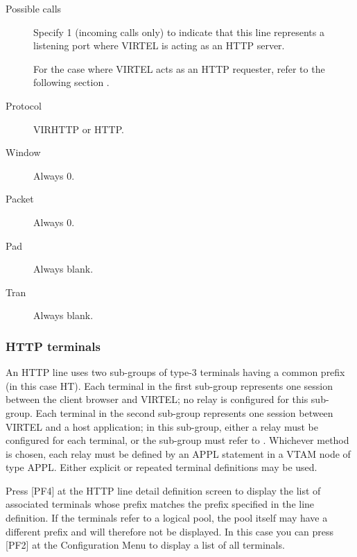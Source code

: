 \documentclass[letterpaper,10pt,english]{sphinxmanual}
\begin{document}
\begin{description}
\item[{Possible calls}] \leavevmode
Specify 1 (incoming calls only) to indicate that this line
represents a listening port where VIRTEL is acting as an HTTP
server.

For the case where VIRTEL acts as an HTTP requester, refer to the following section {\hyperref[\detokenize{connectivity_guide:bookmark42}]{}}.

\item[{Protocol}] \leavevmode
VIRHTTP or HTTP.

\item[{Window}] \leavevmode
Always 0.

\item[{Packet}] \leavevmode
Always 0.

\item[{Pad}] \leavevmode
Always blank.

\item[{Tran}] \leavevmode
Always blank.

\end{description}


\subsubsection{HTTP terminals}
\label{\detokenize{connectivity_guide:http-terminals}}
An HTTP line uses two sub-groups of type-3 terminals having a common prefix (in this case HT). Each terminal in the first sub-group represents one session between the client browser and VIRTEL; no relay is configured for this sub- group. Each terminal in the second sub-group represents one session between VIRTEL and a host application; in this sub-group, either a relay must be configured for each terminal, or the sub-group must refer to {\hyperref[\detokenize{connectivity_guide:bookmark246}]{}}. Whichever method is chosen, each relay must be defined by an APPL statement in a VTAM node of type APPL. Either explicit or repeated terminal definitions may be used.

Press {[}PF4{]} at the HTTP line detail definition screen to display the list of associated terminals whose prefix matches the prefix specified in the line definition. If the terminals refer to a logical pool, the pool itself may have a different prefix and will therefore not be displayed. In this case you can press {[}PF2{]} at the Configuration Menu to display a list of all terminals.
\end{document}
